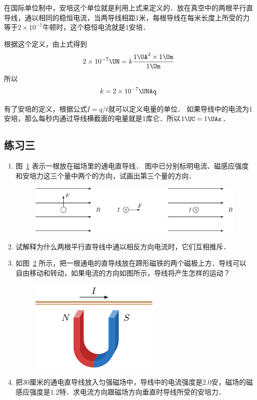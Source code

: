 在国际单位制中，安培这个单位就是利用上式来定义的．放在真空中的两根平行直导线，通以相同的稳恒电流，当两导线相距1米，每根导线在每米长度上所受的力等于$2\times10^{-7}$牛顿时，这个稳恒电流就是1安培．

根据这个定义，由上式得到
\[ 2\times10^{-7} \UN =k\frac{1 \UA^2 \times 1  \Um }{1\Um}\]
所以
\[k=2\times10^{-7}  \UNAq \]

有了安培的定义，根据公式$I=q/t$就可以定义电量的单位．
如果导线中的电流为1安培，那么每秒内通过导线横截面的电量就是1库仑．所以$1 \UC =1 \UAs $．

\subsection*{练习三}
\begin{enumerate}
    \item 图~\ref{fig_C_1-24} 表示一根放在磁场里的通电直导线．
    图中已分别标明电流、磁感应强度和安培力这三个量中两个的方向，试画出第三个量的方向．
    \begin{figure}[htbp]
        \centering
        \includegraphics{fig/C/1-24.pdf}
        \caption{}\label{fig_C_1-24}
    \end{figure}
    \item 试解释为什么两根平行直导线中通以相反方向电流时，它们互相推斥．
    \item 如图~\ref{fig_C_1-25} 所示，把一根通电的直导线放在蹄形磁铁的两个磁极上方．导线可以自由移动和转动，如果电流的方向如图所示，导线将产生怎样的运动？
    \begin{figure}[htbp]
        \centering
        \includegraphics{fig/C/1-25.pdf}
        \caption{}\label{fig_C_1-25}
    \end{figure}
    \item 把30厘米的通电直导线放入匀强磁场中，导线中的电流强度是2.0安，磁场的磁感应强度是1.2特．求电流方向跟磁场方向垂直时导线所受的安培力．
    

\end{enumerate}
